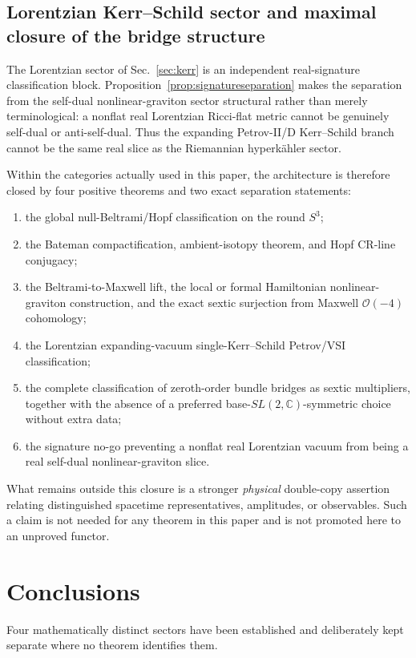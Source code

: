 \documentclass[aps,prd,reprint,nofootinbib,superscriptaddress]{revtex4-2}
\theoremstyle{definition}
\theoremstyle{remark}
\newcommand{\C}{\mathbb{C}}
\newcommand{\cO}{\mathcal{O}}
\begin{document}
\subsection{Lorentzian Kerr--Schild sector and maximal closure of the bridge structure}

The Lorentzian sector of Sec.~\ref{sec:kerr} is an independent real-signature classification block.  Proposition~\ref{prop:signatureseparation} makes the separation from the self-dual nonlinear-graviton sector structural rather than merely terminological: a nonflat real Lorentzian Ricci-flat metric cannot be genuinely self-dual or anti-self-dual.  Thus the expanding Petrov-II/D Kerr--Schild branch cannot be the same real slice as the Riemannian hyperk\"ahler sector.

Within the categories actually used in this paper, the architecture is therefore closed by four positive theorems and two exact separation statements:
\begin{enumerate}
\item the global null-Beltrami/Hopf classification on the round $S^3$;
\item the Bateman compactification, ambient-isotopy theorem, and Hopf CR-line conjugacy;
\item the Beltrami-to-Maxwell lift, the local or formal Hamiltonian nonlinear-graviton construction, and the exact sextic surjection from Maxwell $\cO(-4)$ cohomology;
\item the Lorentzian expanding-vacuum single-Kerr--Schild Petrov/VSI classification;
\item the complete classification of zeroth-order bundle bridges as sextic multipliers, together with the absence of a preferred base-$SL(2,\C)$-symmetric choice without extra data;
\item the signature no-go preventing a nonflat real Lorentzian vacuum from being a real self-dual nonlinear-graviton slice.
\end{enumerate}
What remains outside this closure is a stronger \emph{physical} double-copy assertion relating distinguished spacetime representatives, amplitudes, or observables.  Such a claim is not needed for any theorem in this paper and is not promoted here to an unproved functor.

\section{Conclusions}

Four mathematically distinct sectors have been established and deliberately kept separate where no theorem identifies them.
\end{document}
